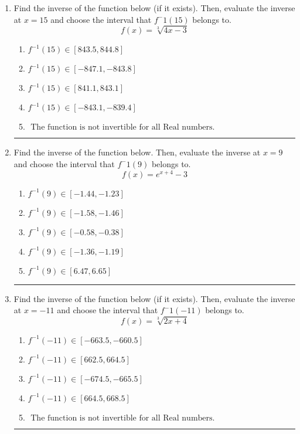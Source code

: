 \documentclass[14pt]{extbook}
\newcommand{\litem}[1]{\item#1\hspace*{-1cm}\rule{\textwidth}{0.4pt}}
\begin{document}
\begin{enumerate}
{\begin{enumerate}[label=\Alph*.]
\end{enumerate} }
\litem{
Find the inverse of the function below (if it exists). Then, evaluate the inverse at $x = 15$ and choose the interval that $f^-1(15)$ belongs to.\[ f(x) = \sqrt[3]{4 x - 3} \]\begin{enumerate}[label=\Alph*.]
\item \( f^{-1}(15) \in [843.5, 844.8] \)
\item \( f^{-1}(15) \in [-847.1, -843.8] \)
\item \( f^{-1}(15) \in [841.1, 843.1] \)
\item \( f^{-1}(15) \in [-843.1, -839.4] \)
\item \( \text{ The function is not invertible for all Real numbers. } \)

\end{enumerate} }
\litem{
Find the inverse of the function below. Then, evaluate the inverse at $x = 9$ and choose the interval that $f^-1(9)$ belongs to.\[ f(x) = e^{x+4}-3 \]\begin{enumerate}[label=\Alph*.]
\item \( f^{-1}(9) \in [-1.44, -1.23] \)
\item \( f^{-1}(9) \in [-1.58, -1.46] \)
\item \( f^{-1}(9) \in [-0.58, -0.38] \)
\item \( f^{-1}(9) \in [-1.36, -1.19] \)
\item \( f^{-1}(9) \in [6.47, 6.65] \)

\end{enumerate} }
\litem{
Find the inverse of the function below (if it exists). Then, evaluate the inverse at $x = -11$ and choose the interval that $f^-1(-11)$ belongs to.\[ f(x) = \sqrt[3]{2 x + 4} \]\begin{enumerate}[label=\Alph*.]
\item \( f^{-1}(-11) \in [-663.5, -660.5] \)
\item \( f^{-1}(-11) \in [662.5, 664.5] \)
\item \( f^{-1}(-11) \in [-674.5, -665.5] \)
\item \( f^{-1}(-11) \in [664.5, 668.5] \)
\item \( \text{ The function is not invertible for all Real numbers. } \)


\end{enumerate}}
\end{enumerate}
\end{document}
